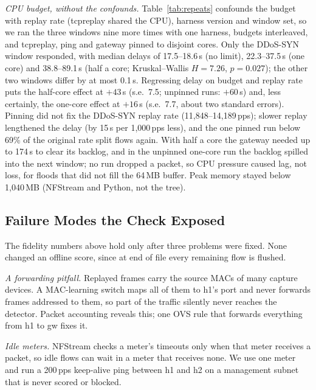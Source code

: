 \emph{CPU budget, without the confounds.} Table~\ref{tab:repeats} confounds the budget with replay rate (tcpreplay shared the CPU), harness version and window set, so we ran the three windows nine more times with one harness, budgets interleaved, and tcpreplay, ping and gateway pinned to disjoint cores. Only the DDoS-SYN window responded, with median delays of 17.5--18.6\,s (no limit), 22.3--37.5\,s (one core) and 38.8--89.1\,s (half a core; Kruskal--Wallis $H=7.26$, $p=0.027$); the other two windows differ by at most 0.1\,s. Regressing delay on budget and replay rate puts the half-core effect at $+43$\,s (s.e.\ 7.5; unpinned runs: $+60$\,s) and, less certainly, the one-core effect at $+16$\,s (s.e.\ 7.7, about two standard errors). Pinning did not fix the DDoS-SYN replay rate (11,848--14,189\,pps); slower replay lengthened the delay (by 15\,s per 1,000\,pps less), and the one pinned run below 69\% of the original rate split flows again. With half a core the gateway needed up to 174\,s to clear its backlog, and in the unpinned one-core run the backlog spilled into the next window; no run dropped a packet, so CPU pressure caused lag, not loss, for floods that did not fill the 64\,MB buffer. Peak memory stayed below 1,040\,MB (NFStream and Python, not the tree).

\subsection{Failure Modes the Check Exposed}\label{sec:defect}

The fidelity numbers above hold only after three problems were fixed. None changed an offline score, since at end of file every remaining flow is flushed.

\emph{A forwarding pitfall.} Replayed frames carry the source MACs of many capture devices. A MAC-learning switch maps all of them to h1's port and never forwards frames addressed to them, so part of the traffic silently never reaches the detector. Packet accounting reveals this; one OVS rule that forwards everything from h1 to gw fixes it.

\emph{Idle meters.} NFStream checks a meter's timeouts only when that meter receives a packet, so idle flows can wait in a meter that receives none. We use one meter and run a 200\,pps keep-alive ping between h1 and h2 on a management subnet that is never scored or blocked.


